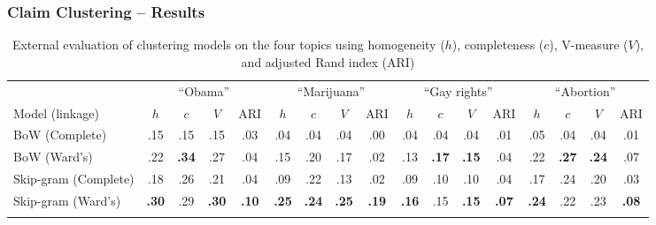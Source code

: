 \documentclass{beamer}
\begin{document}

\begin{frame}
	\frametitle{Claim Clustering -- Results}

\begin{table}[t]
\begin{center}
{\tiny
\setlength{\tabcolsep}{0.5em}
\begin{tabular}{@{}l cccc cccc cccc cccc@{}}
\toprule
& \multicolumn{4}{c}{``Obama''} & \multicolumn{4}{c}{``Marijuana''} &
	\multicolumn{4}{c}{``Gay rights''} & \multicolumn{4}{c}{``Abortion''}
	\\
\cmidrule(lr){2-5}
\cmidrule(lr){6-9}
\cmidrule(lr){10-13}
\cmidrule(lr){14-17}
Model (linkage) &
$h$ & $c$ & $V$ & ARI &
$h$ & $c$ & $V$ & ARI &
$h$ & $c$ & $V$ & ARI &
$h$ & $c$ & $V$ & ARI \\
\midrule
BoW (Complete) &
.15 & .15 & .15 & .03 & 
.04 & .04 & .04 & .00 & 
.04 & .04 & .04 & .01 & 
.05 & .04 & .04 & .01\\
BoW (Ward's) & 
.22 & \textbf{.34} & .27 & .04 & 
.15 & .20 & .17 & .02 & 
.13 & \textbf{.17} & \textbf{.15} & .04 & 
.22 & \textbf{.27} & \textbf{.24} & .07 \\
Skip-gram (Complete) & 
.18 & .26 & .21 & .04 & 
.09 & .22 & .13 & .02 & 
.09 & .10 & .10 & .04 & 
.17 & .24 & .20 & .03  \\
Skip-gram (Ward's) & 
\textbf{.30} & .29 & \textbf{.30} & \textbf{.10} & 
\textbf{.25} & \textbf{.24} & \textbf{.25} & \textbf{.19} & 
\textbf{.16} & .15 & \textbf{.15} & \textbf{.07} & 
\textbf{.24} & .22 & .23 & \textbf{.08} \\
 \\
\bottomrule
\end{tabular}}
\caption{External evaluation of clustering models on the four topics using 
	homogeneity ($h$), completeness ($c$), V-measure ($V$), and adjusted
	Rand index (ARI) }
\label{tab:external-eval}
\end{center}
\end{table}

\end{frame}
\end{document}
